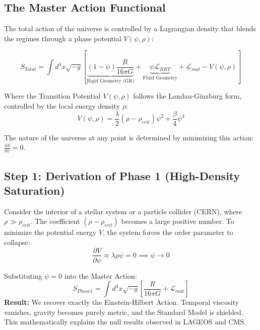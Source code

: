 \documentclass[10pt, a4paper]{article}
\begin{document}
\subsection{The Master Action Functional}
The total action of the universe is controlled by a Lagrangian density that blends the regimes through a phase potential $V(\psi, \rho)$:

\begin{equation}
S_{Total} = \int d^4x \sqrt{-g} \left[ \underbrace{(1 - \psi) \frac{R}{16\pi G}}_{\text{Rigid Geometry (GR)}} + \underbrace{\psi \mathcal{L}_{RRT}}_{\text{Fluid Geometry}} + \mathcal{L}_{mat} - V(\psi, \rho) \right]
\end{equation}

Where the Transition Potential $V(\psi, \rho)$ follows the Landau-Ginzburg form, controlled by the local energy density $\rho$:
\begin{equation}
V(\psi, \rho) = \frac{\lambda}{2} (\rho - \rho_{crit}) \psi^2 + \frac{\beta}{4} \psi^4
\end{equation}

The nature of the universe at any point is determined by minimizing this action: $\frac{\delta S}{\delta \psi} = 0$.

\subsection{Step 1: Derivation of Phase 1 (High-Density Saturation)}
Consider the interior of a stellar system or a particle collider (CERN), where $\rho \gg \rho_{crit}$.
The coefficient $(\rho - \rho_{crit})$ becomes a large positive number. To minimize the potential energy $V$, the system forces the order parameter to collapse:
\begin{equation}
\frac{\partial V}{\partial \psi} \approx \lambda \rho \psi = 0 \implies \psi \to 0
\end{equation}

Substituting $\psi = 0$ into the Master Action:
\begin{equation}
S_{Phase 1} = \int d^4x \sqrt{-g} \left[ \frac{R}{16\pi G} + \mathcal{L}_{mat} \right]
\end{equation}
\textbf{Result:} We recover exactly the Einstein-Hilbert Action. Temporal viscosity vanishes, gravity becomes purely metric, and the Standard Model is shielded. This mathematically explains the null results observed in LAGEOS and CMS.
\end{document}
